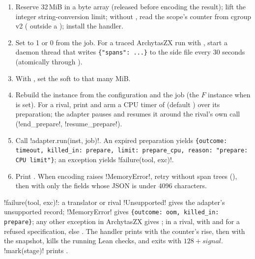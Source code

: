 \begin{algorithm}
\begin{enumerate}
\item Reserve 32\,MiB in a byte array (released before encoding the result); lift the integer
  string-conversion limit; without , read the scope's 
  counter from cgroup v2  ( outside a ); install the
   handler.
\item Set  to 1 or 0 from the job. For a traced ArchytasZX run with
  , start a daemon thread that writes \texttt{\{"spans": ...\}} to the side
  file every 30 seconds (atomically through ).
\item With , set the soft  to that many MiB.
\item Rebuild the instance from the configuration and the job (the $F$ instance when
   is set). For a rival, print  and arm a CPU timer of
   (default ) over its preparation;
  the adapter pauses and resumes it around the rival's own call (\py!end_prepare!,
  \py!resume_prepare!).
\item Call \py!adapter.run(inst, job)!. An expired preparation yields \texttt{\{outcome: timeout, killed\_in: prepare, limit: prepare\_cpu, reason: "prepare: CPU limit"\}}; an exception
  yields \py!failure(tool, exc)!.
\item Print . When encoding raises \py!MemoryError!, retry without span trees
  (), then with only the fields whose JSON is under 4096
  characters.
\end{enumerate}
\end{algorithm}

\py!failure(tool, exc)!: a translator or rival \py!Unsupported! gives the adapter's unsupported
record; \py!MemoryError! gives \texttt{\{outcome: oom, killed\_in: prepare\}}; any other exception
in ArchytasZX gives ; in a rival,  with  and  for a refused specification, else . The  handler prints  with the counter's rise,
then  with the snapshot, kills the running Lean checks, and exits with
$128+\mathit{signal}$. \py!mark(stage)! prints .

